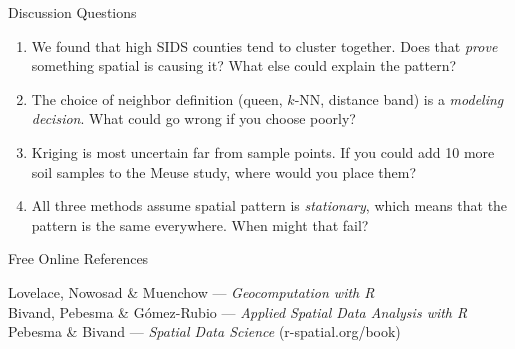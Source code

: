 \documentclass[aspectratio=169, 12pt]{beamer}
\begin{document}

\begin{frame}{Discussion Questions}
  \begin{enumerate}
    \setlength\itemsep{1em}
    \item We found that high SIDS counties tend to cluster together. Does that \textit{prove} something spatial is causing it? What else could explain the pattern?

    \item The choice of neighbor definition (queen, $k$-NN, distance band) is a \textit{modeling decision}. What could go wrong if you choose poorly?

    \item Kriging is most uncertain far from sample points. If you could add 10 more soil samples to the Meuse study, where would you place them?

    \item All three methods assume spatial pattern is \textit{stationary}, which means that the pattern is the same everywhere. When might that fail?
  \end{enumerate}
\end{frame}


\begin{frame}{Free Online References}
  \begin{center}
    Lovelace, Nowosad \& Muenchow --- \textit{Geocomputation with R}\\
    Bivand, Pebesma \& G\'{o}mez-Rubio --- \textit{Applied Spatial Data Analysis with R}\\
    Pebesma \& Bivand --- \textit{Spatial Data Science} (r-spatial.org/book)
  \end{center}
\end{frame}
\end{document}
